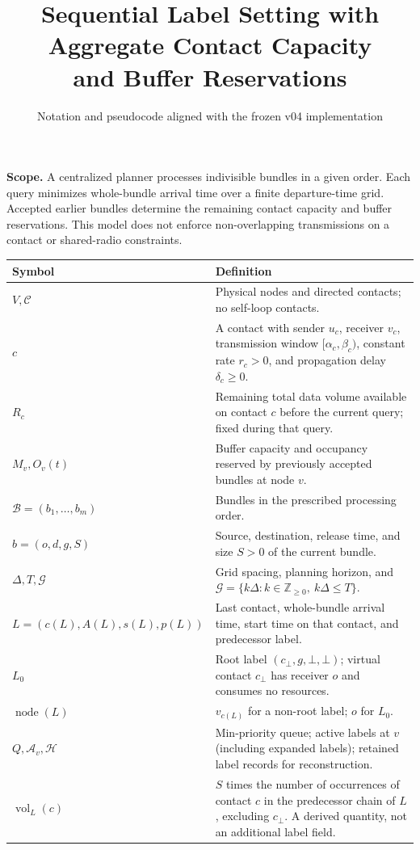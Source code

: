 \documentclass[10pt,a4paper]{article}
\title{Sequential Label Setting with Aggregate Contact Capacity\\and Buffer Reservations}
\author{}
\date{Notation and pseudocode aligned with the frozen v04 implementation}
\newcommand{\nil}{\bot}
\newcommand{\grid}{\mathcal{G}}
\newcommand{\node}{\operatorname{node}}
\newcommand{\vol}{\operatorname{vol}}
\begin{document}
\maketitle
\noindent\textbf{Scope.} A centralized planner processes indivisible bundles in a given order.
Each query minimizes whole-bundle arrival time over a finite departure-time grid.
Accepted earlier bundles determine the remaining contact capacity and buffer reservations.
This model does not enforce non-overlapping transmissions on a contact or shared-radio constraints.

\medskip
\begin{tabularx}{\linewidth}{@{}lX@{}}
\toprule Symbol & Definition \\
\midrule
$V,\mathcal C$ & Physical nodes and directed contacts; no self-loop contacts. \\
$c$ & A contact with sender $u_c$, receiver $v_c$, transmission window $[\alpha_c,\beta_c)$, constant rate $r_c>0$, and propagation delay $\delta_c\geq0$. \\
$R_c$ & Remaining total data volume available on contact $c$ before the current query; fixed during that query. \\
$M_v,O_v(t)$ & Buffer capacity and occupancy reserved by previously accepted bundles at node $v$. \\
$\mathcal B=(b_1,\ldots,b_m)$ & Bundles in the prescribed processing order. \\
$b=(o,d,g,S)$ & Source, destination, release time, and size $S>0$ of the current bundle. \\
$\Delta,T,\grid$ & Grid spacing, planning horizon, and $\grid=\{k\Delta:k\in\mathbb Z_{\geq0},\ k\Delta\leq T\}$. \\
$L=(c(L),A(L),s(L),p(L))$ & Last contact, whole-bundle arrival time, start time on that contact, and predecessor label. \\
$L_0$ & Root label $(c_{\nil},g,\nil,\nil)$; virtual contact $c_{\nil}$ has receiver $o$ and consumes no resources. \\
$\node(L)$ & $v_{c(L)}$ for a non-root label; $o$ for $L_0$. \\
$Q,\mathcal A_v,\mathcal H$ & Min-priority queue; active labels at $v$ (including expanded labels); retained label records for reconstruction. \\
$\vol_L(c)$ & $S$ times the number of occurrences of contact $c$ in the predecessor chain of $L$, excluding $c_{\nil}$. A derived quantity, not an additional label field. \\
\bottomrule
\end{tabularx}
\end{document}

